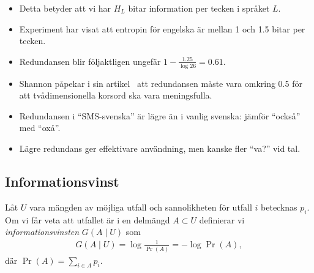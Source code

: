 \documentclass{beamer}
\theoremstyle{definition}
\begin{document}
\begin{frame}{\insertsubsectionhead}
  \begin{itemize}
    \item Detta betyder att vi har \(H_L\) bitar information per tecken 
      i språket \(L\).

    \item Experiment har visat att entropin för engelska är mellan 1 och 1.5 
      bitar per tecken.

    \item Redundansen blir följaktligen ungefär \(1 - \frac{1.25}{\log 26} 
      = 0.61\).

    \item Shannon påpekar i sin artikel~\cite{Shannon1948amt} att redundansen 
      måste vara omkring 0.5 för att tvådimensionella korsord ska vara 
      meningsfulla.

    \item Redundansen i \enquote{SMS-svenska} är lägre än i vanlig svenska: 
      jämför \enquote{också} med \enquote{oxå}.

    \item Lägre redundans ger effektivare användning, men kanske fler 
      \enquote{va?} vid tal.

  \end{itemize}
\end{frame}

%
%
%

\subsection{Informationsvinst}

\begin{frame}{\insertsubsectionhead}
  \begin{definition}
    Låt \(U\) vara mängden av möjliga utfall och sannolikheten för utfall \(i\) 
    betecknas \(p_i\).
    Om vi får veta att utfallet är i en delmängd \(A\subset U\) definierar vi 
    \emph{informationsvinsten} \(G(A\mid U)\) som
    \begin{align*}
      G(A\mid U) = \log\frac{1}{\Pr(A)} = -\log\Pr(A),
    \end{align*}
    där \(\Pr(A) = \sum_{i\in A} p_i\).
  \end{definition}
\end{frame}
\end{document}
